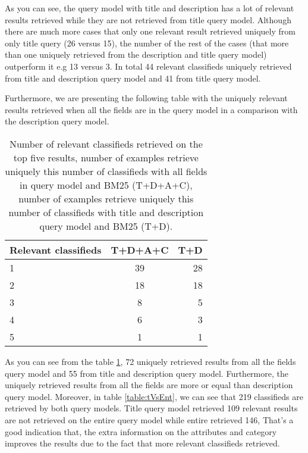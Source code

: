 As you can see, the query model with title and description has a lot of relevant results retrieved while they are not retrieved from title query model. Although there are much more cases that only one relevant result retrieved uniquely from only title query (26 versus 15), the number of the rest of the cases (that more than one uniquely retrieved from the description and title query model) outperform it e.g 13 versus 3. In total 44 relevant classifieds uniquely retrieved from title and description query model and 41 from title query model.



Furthermore, we are presenting the following table with the uniquely relevant results retrieved when all the fields are in the query model in a comparison with the description query model.

\begin{table}[H]
\begin{center}
\caption{Number of relevant classifieds retrieved on the top five results, number of examples retrieve uniquely this number of classifieds with all fields in query model and BM25 (T+D+A+C), number of examples retrieve uniquely this number of classifieds with title and description query model and BM25 (T+D).}
\label{table:tVsEntRank}
\begin{tabular}{lcr}
\midrule
Relevant classifieds &  T+D+A+C & T+D \\
\midrule
	1 & 39 & 28 \\
	2 & 18 & 18 \\
	3 & 8 & 5 \\
	4 & 6 & 3 \\
	5 & 1 & 1 \\
\bottomrule
\end{tabular}
\end{center}
\end{table}

As you can see from the table \ref{table:tVsEntRank}, 72 uniquely retrieved results from all the fields query model and 55 from title and description query model. Furthermore, the uniquely retrieved results from all the fields are more or equal than description query model. Moreover, in table \ref{table:tVsEnt}, we can see that 219 classifieds are retrieved by both query models. Title query model retrieved 109 relevant results are not retrieved on the entire query model while entire retrieved 146, That's a good indication that, the extra information on the attributes and category improves the results due to the fact that more relevant classifieds retrieved.

